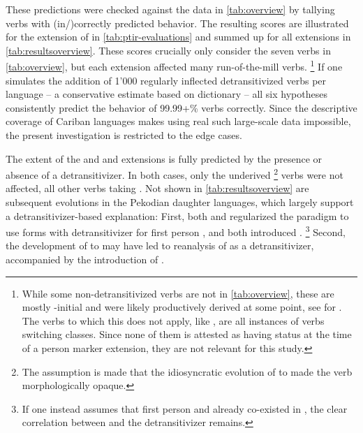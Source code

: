These predictions were checked against the data in \cref{tab:overview} by tallying verbs with (in\-/)correctly predicted behavior.
The resulting scores are illustrated for the extension of \PTir {} in \cref{tab:ptir-evaluations} and summed up for all extensions in \cref{tab:resultsoverview}.
These scores crucially only consider the seven verbs in \cref{tab:overview}, but each extension affected many run-of-the-mill  verbs.%
\footnote{
While some non-detransitivized  verbs \parencites[252]{triomeira1999}[222]{meira2000split}[30]{gildea2007greenberg} are not in \cref{tab:overview}, these are mostly -initial and were likely productively derived at some point, see \textcite[252]{triomeira1999} for \trio.
The verbs to which this does not apply, like \trio {}  \parencites[252]{triomeira1999}, are all instances of  verbs switching classes.
Since none of them is attested as having  status at the time of a person marker extension, they are not relevant for this study.}
If one simulates the addition of 1'000 regularly inflected detransitivized  verbs per language -- a conservative estimate based on  \kalina dictionary -- all six hypotheses consistently predict the behavior of 99.99+\% verbs correctly.
Since the descriptive coverage of Cariban languages makes using real such large-scale data impossible, the present investigation is restricted to the edge cases.




The extent of the \PWai and \PPek and extensions is fully predicted by the presence or absence of a detransitivizer.
In both cases, only the underived%
\footnote{The assumption is made that the idiosyncratic evolution of   to  \PPek made the verb morphologically opaque.}
 verbs were not affected, all other  verbs taking .
Not shown in \cref{tab:resultsoverview} are subsequent evolutions in the Pekodian daughter languages, which largely support a detransitivizer-based explanation:
First, both \ikpeng and \bakairi regularized the paradigm to use forms with detransitivizer for first person , and both introduced .%
\footnote{If one instead assumes that first person  and  already co-existed in \PPek, the clear correlation between  and the detransitivizer remains.}
Second, the development of \PPek {}  to \ikpeng {} may have led to reanalysis of  as a detransitivizer, accompanied by the introduction of .

